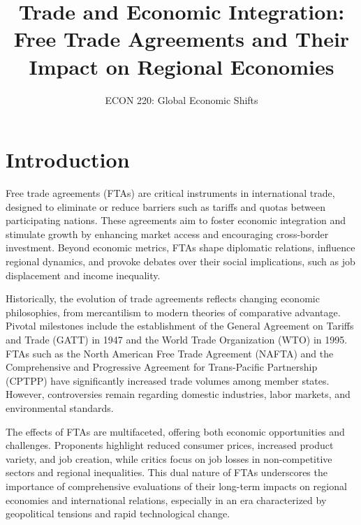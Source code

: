\documentclass[12pt]{article}
\title{Trade and Economic Integration: \newline Free Trade Agreements and Their Impact on Regional Economies}
\author{ECON 220: Global Economic Shifts}
\date{}
\begin{document}
\maketitle

\tableofcontents

\newpage

\section*{Introduction}
Free trade agreements (FTAs) are critical instruments in international trade, designed to eliminate or reduce barriers such as tariffs and quotas between participating nations. These agreements aim to foster economic integration and stimulate growth by enhancing market access and encouraging cross-border investment. Beyond economic metrics, FTAs shape diplomatic relations, influence regional dynamics, and provoke debates over their social implications, such as job displacement and income inequality.

Historically, the evolution of trade agreements reflects changing economic philosophies, from mercantilism to modern theories of comparative advantage. Pivotal milestones include the establishment of the General Agreement on Tariffs and Trade (GATT) in 1947 and the World Trade Organization (WTO) in 1995. FTAs such as the North American Free Trade Agreement (NAFTA) and the Comprehensive and Progressive Agreement for Trans-Pacific Partnership (CPTPP) have significantly increased trade volumes among member states. However, controversies remain regarding domestic industries, labor markets, and environmental standards.

The effects of FTAs are multifaceted, offering both economic opportunities and challenges. Proponents highlight reduced consumer prices, increased product variety, and job creation, while critics focus on job losses in non-competitive sectors and regional inequalities. This dual nature of FTAs underscores the importance of comprehensive evaluations of their long-term impacts on regional economies and international relations, especially in an era characterized by geopolitical tensions and rapid technological change.
\end{document}
